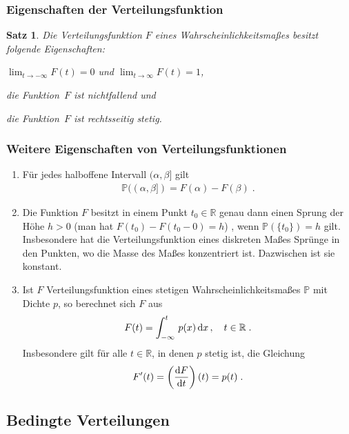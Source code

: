 \documentclass[ngerman,draft,parskip=half,twoside]{scrartcl}
\newtheorem{thm}{Satz}[section]
\newcommand*{\R}{\mathbb{R}}      %
\newcommand*{\WKM}{\mathbb{P}}      %
\newcommand*{\diff}[1]{%
  \mathop{\mathrm{\mathstrut d}}%
  \ifx#1(\else%
  \ifx#1[\else%
  \ifx#1\{\else%
    \!%
  \fi\fi\fi#1%
}
\begin{document}
\subsubsection{Eigenschaften der Verteilungsfunktion}
\begin{thm}
\label{VF}
Die Verteilungsfunktion $F$ eines Wahrscheinlichkeitsmaßes besitzt folgende Eigenschaften:
  \begin{eigenschaften}
   \item $\lim_{t\to -\infty} F(t)=0$ und $\lim_{t\to\infty} F(t)=1$,
   \item die Funktion~$F$ ist nichtfallend und
   \item die Funktion~$F$ ist rechtsseitig stetig.
  \end{eigenschaften}
\end{thm}
\subsubsection{Weitere Eigenschaften von Verteilungsfunktionen}
\begin{enumerate}[label=(\alph*)]
 \item
Für jedes halboffene Intervall $(\alpha,\beta]$ gilt
  \begin{gather*}
    \WKM((\alpha,\beta])= F(\alpha)-F(\beta)\;.
  \end{gather*}
 \item
Die Funktion $F$ besitzt in einem Punkt $t_0\in\R$ genau dann einen Sprung der Höhe
$h>0$ (man hat $F(t_0)-F(t_0-0)=h$) , wenn $\WKM(\{t_0\})=h$ gilt. Insbesondere hat die
Verteilungsfunktion eines diskreten Maßes Sprünge in den Punkten, wo die Masse
des Maßes konzentriert ist. Dazwischen ist sie konstant.
 \item
Ist $F$ Verteilungsfunktion eines stetigen Wahrscheinlichkeitsmaßes $\WKM$ mit Dichte $p$, so berechnet
sich $F$ aus
  \begin{gather*}
    F(t)=\int_{-\infty}^t\,p(x)\diff{x}\,,\quad t\in\R\;.
  \end{gather*}
Insbesondere gilt für alle $t\in\R$, in denen $p$ stetig ist, die Gleichung
  \begin{gather*}
    F'(t)=\left(\frac{\diff{F}}{\diff{t}} \right)(t)= p(t)\;.
  \end{gather*}
\end{enumerate}
\subsection{Bedingte Verteilungen}
\end{document}
